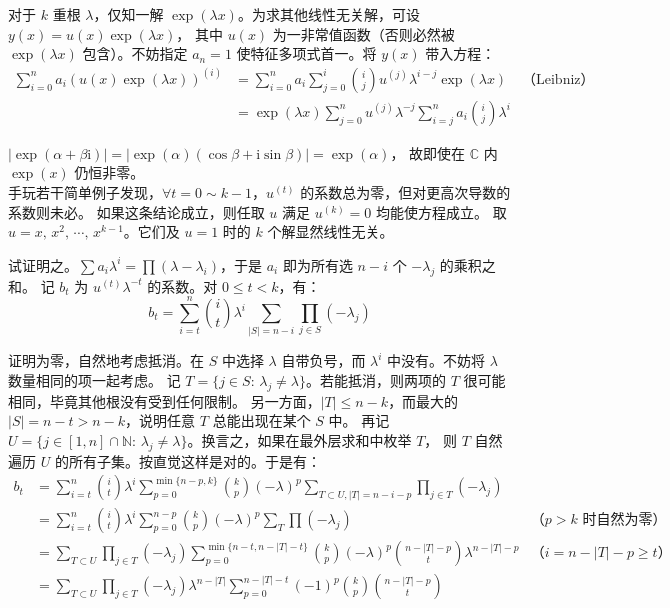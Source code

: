 \documentclass[12pt, a4paper, UTF8, openany]{ctexbook}
\newcommand{\field}[1]{\mathbb{#1}}%
\newcommand{\imunit}{\mathrm{i}}%
\begin{document}
        对于 $k$ 重根 $\lambda$，仅知一解 $\exp(\lambda x)$。为求其他线性无关解，可设 $y(x) = u(x)\exp(\lambda x)$，
        其中 $u(x)$ 为一非常值函数（否则必然被 $\exp(\lambda x)$ 包含）。不妨指定 $a_n = 1$ 使特征多项式首一。将 $y(x)$ 带入方程：
        $$\begin{aligned}
            \sum_{i = 0}^{n} a_i (u(x)\exp(\lambda x))^{(i)}
            & = \sum_{i = 0}^{n} a_i \sum_{j = 0}^{i} \binom{i}{j} u^{(j)} \lambda^{i - j} \exp(\lambda x) & \text{（Leibniz）} \\
            & = \exp(\lambda x) \sum_{j = 0}^{n} u^{(j)} \lambda^{-j} \sum_{i = j}^{n} a_i \binom{i}{j} \lambda^{i}
        \end{aligned}$$

        $|\exp(\alpha + \beta\imunit)| = |\exp(\alpha)(\cos\beta + \imunit\sin\beta)| = \exp(\alpha)$，
        故即使在 $\field{C}$ 内 $\exp(x)$ 仍恒非零。\\
        手玩若干简单例子发现，$\forall t = 0 \sim k - 1$，$u^{(t)}$ 的系数总为零，但对更高次导数的系数则未必。
        如果这条结论成立，则任取 $u$ 满足 $u^{(k)} = 0$ 均能使方程成立。
        取 $u = x, \, x^2, \, \cdots, \, x^{k - 1}$。它们及 $u = 1$ 时的 $k$ 个解显然线性无关。

        试证明之。$\sum a_i \lambda^i = \prod (\lambda - \lambda_i)$，于是 $a_i$ 即为所有选 $n - i$ 个 $-\lambda_j$ 的乘积之和。
        记 $b_t$ 为 $u^{(t)}\lambda^{-t}$ 的系数。对 $0 \leqslant t < k$，有：
        $$b_t = \sum_{i = t}^{n} \binom{i}{t} \lambda^{i} \sum_{|S| = n - i} \prod_{j \in S} (-\lambda_j)$$

        证明为零，自然地考虑抵消。在 $S$ 中选择 $\lambda$ 自带负号，而 $\lambda^i$ 中没有。不妨将 $\lambda$ 数量相同的项一起考虑。
        记 $T = \{j \in S: \, \lambda_j \neq \lambda\}$。若能抵消，则两项的 $T$ 很可能相同，毕竟其他根没有受到任何限制。
        另一方面，$|T| \leqslant n - k$，而最大的 $|S| = n - t > n - k$，说明任意 $T$ 总能出现在某个 $S$ 中。
        再记 $U = \{j \in [1, n] \cap \field{N}: \, \lambda_j \neq \lambda\}$。换言之，如果在最外层求和中枚举 $T$，
        则 $T$ 自然遍历 $U$ 的所有子集。按直觉这样是对的。于是有：
        $$\begin{aligned}
            b_t & = \sum_{i = t}^{n} \binom{i}{t} \lambda^i \sum_{p = 0}^{\min\{n - p, k\}} \binom{k}{p}(-\lambda)^{p}
            \sum_{T \subset U, |T| = n - i - p} \prod_{j \in T} (-\lambda_j) & \\
            & = \sum_{i = t}^{n} \binom{i}{t} \lambda^i \sum_{p = 0}^{n - p} \binom{k}{p}(-\lambda)^{p}
            \sum_{T} \prod (-\lambda_j) & \text{（}p > k\text{ 时自然为零）} \\
            & = \sum_{T \subset U} \prod_{j \in T} (-\lambda_j) 
            \sum_{p = 0}^{\min\{n - t, n - |T| - t\}} \binom{k}{p} (-\lambda)^p \binom{n - |T| - p}{t} \lambda^{n - |T| - p}
            & \text{（}i = n - |T| - p \geqslant t\text{）} \\
            & = \sum_{T \subset U} \prod_{j \in T} (-\lambda_j) \lambda^{n - |T|} 
            \sum_{p = 0}^{n - |T| - t} (-1)^p \binom{k}{p} \binom{n - |T| - p}{t}
        \end{aligned}$$
\end{document}
